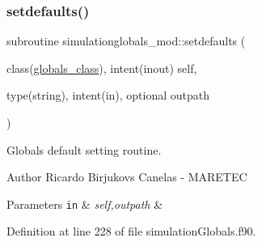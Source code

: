\subsubsection{\texorpdfstring{setdefaults()}{setdefaults()}}
{\footnotesize\ttfamily subroutine simulationglobals\+\_\+mod\+::setdefaults (\begin{DoxyParamCaption}\item[{class(\mbox{\hyperlink{structsimulationglobals__mod_1_1globals__class}{globals\+\_\+class}}), intent(inout)}]{self,  }\item[{type(string), intent(in), optional}]{outpath }\end{DoxyParamCaption})\hspace{0.3cm}{\ttfamily [private]}}



Globals default setting routine. 

\begin{DoxyAuthor}{Author}
Ricardo Birjukovs Canelas -\/ M\+A\+R\+E\+T\+EC 
\end{DoxyAuthor}

\begin{DoxyParams}[1]{Parameters}
\mbox{\tt in}  & {\em self,outpath} & \\
\hline
\end{DoxyParams}


Definition at line 228 of file simulation\+Globals.\+f90.


